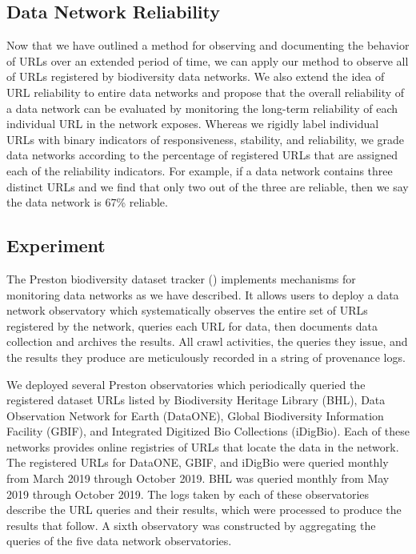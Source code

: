 \documentclass[12pt,letterpaper]{article}
\begin{document}
\subsection*{Data Network Reliability}

Now that we have outlined a method for observing and documenting the behavior of URLs over an extended period of time, we can apply our method to observe all of URLs registered by biodiversity data networks. We also extend the idea of URL reliability to entire data networks and propose that the overall reliability of a data network can be evaluated by monitoring the long-term reliability of each individual URL in the network exposes. Whereas we rigidly label individual URLs with binary indicators of responsiveness, stability, and reliability, we grade data networks according to the percentage of registered URLs that are assigned each of the reliability indicators. For example, if a data network contains three distinct URLs and we find that only two out of the three are reliable, then we say the data network is 67\% reliable.

\subsection*{Experiment}

The Preston biodiversity dataset tracker (\cite{jorrit_poelen_2018_1410543}) implements mechanisms for monitoring data networks as we have described. It allows users to deploy a data network observatory which systematically observes the entire set of URLs registered by the network, queries each URL for data, then documents data collection and archives the results. All crawl activities, the queries they issue, and the results they produce are meticulously recorded in a string of provenance logs.

We deployed several Preston observatories which periodically queried the registered dataset URLs listed by Biodiversity Heritage Library (BHL), Data Observation Network for Earth (DataONE), Global Biodiversity Information Facility (GBIF), and Integrated Digitized Bio Collections (iDigBio). Each of these networks provides online registries of URLs that locate the data in the network. The registered URLs for DataONE, GBIF, and iDigBio were queried monthly from March 2019 through October 2019. BHL was queried monthly from May 2019 through October 2019. The logs taken by each of these observatories describe the URL queries and their results, which were processed to produce the results that follow. A sixth observatory was constructed by aggregating the queries of the five data network observatories.
\end{document}

